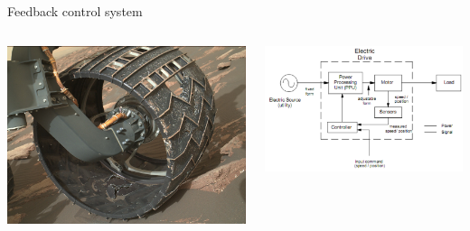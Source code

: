 \documentclass[presentation,aspectratio=169, usenames, dvipsnames]{beamer}
\begin{document}
\begin{frame}[label={sec:orga50fd22}]{Feedback control system}
\begin{columns}
\begin{column}{0.4\columnwidth}
\begin{center}
 \includegraphics[width=1.0\linewidth]{../../figures/curiosity-wheel.jpg}
\end{center}
\end{column}

\begin{column}{0.6\columnwidth}
\pause

\begin{center}
\includegraphics[width=\linewidth]{../../figures/electric-drive-block.png}
\end{center}
\end{column}
\end{columns}
\end{frame}
\end{document}
